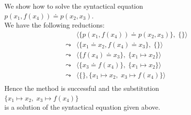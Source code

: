 \exampleEng
We show how to solve the syntactical equation \\[0.2cm]
\hspace*{1.3cm}  $p(x_1, f(x_4)) \doteq p( x_2, x_3)$.  \\[0.2cm]
We have the following reductions:
$$
\begin{array}{ll}
          &  \big\langle \big\{ p(x_1, f(x_4)) \doteq p( x_2, x_3) \big\},\; \{ \} \big\rangle \\[0.2cm]
 \leadsto &  \big\langle \big\{ x_1 \doteq x_2, f(x_4) \doteq x_3 \big\},\; \{ \} \big\rangle \\[0.2cm]
 \leadsto &  \big\langle \big\{ f(x_4) \doteq x_3 \big\},\; \{ x_1 \mapsto x_2 \} \big\rangle \\[0.2cm]
 \leadsto &  \big\langle \big\{ x_3 \doteq f(x_4) \big\},\; \{ x_1 \mapsto x_2 \} \big\rangle \\[0.2cm]
 \leadsto &  \big\langle \big\{\big\}, \{ x_1 \mapsto x_2,\; x_3 \mapsto f(x_4) \} \big\rangle \\[0.2cm]
\end{array}
$$
Hence the method is successful and the substitution
\\[0.2cm]
\hspace*{1.3cm}
$\{ x_1 \mapsto x_2,\; x_3 \mapsto f(x_4) \}$ \\[0.2cm]
is a solution of the syntactical equation given above.  \eox

